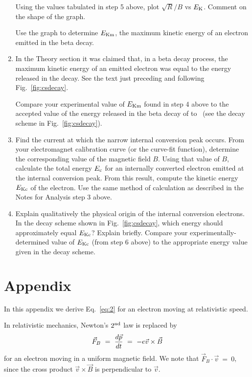 \begin{enumerate}
Using the values tabulated in step 5 above, plot
$\sqrt{R}/B$ vs $E_{\rm K}$.  Comment on the shape of the
graph.

Use the graph to determine $E_{\rm Km}$, the maximum kinetic energy of an
electron emitted in the beta decay.

\item In the Theory section it was claimed that, in a beta decay
process, the maximum kinetic energy of an emitted electron was equal to
the energy released in the decay.  See the text just preceding and
following Fig.~\ref{fig:csdecay}.

Compare your experimental value of $E_{\rm Km}$ found in step 4 above to the
accepted value of the energy released in the beta decay of \cs to \bam~(see the
\cs decay scheme in Fig.~\ref{fig:csdecay}).

\item Find the current at which the narrow internal conversion peak occurs.
  From your electromagnet calibration curve (or the curve-fit function),
  determine the corresponding value of the magnetic field $B$.  Using that value
  of $B$, calculate the total energy $E_{\rm c}$ for an internally converted
  electron emitted at the internal conversion peak.  From this result, compute
  the kinetic energy $E_{\rm Kc}$ of the electron.  Use the same method of
  calculation as described in the Notes for Analysis step 3 above.

\item Explain qualitatively the physical origin of the internal
conversion electrons.  In the decay scheme shown in Fig.~\ref{fig:csdecay}, which
energy should approximately equal $E_{\rm Kc}$?
Explain briefly.  Compare your experimentally-determined value of
$E_{\rm Kc}$ (from step 6 above) to the
appropriate energy value given in the decay scheme.
\end{enumerate}

\section{Appendix}
In this appendix we derive Eq.~\ref{eq:2} for an electron moving at relativistic
speed.

In relativistic mechanics, Newton's
$2^{\rm nd}$ law is replaced by
\begin{equation}
\vec{F}_B ~=~ {d\vec{p} \over dt} ~=~ -e \vec{v} \times \vec{B}
\end{equation}
for an electron
moving  in a uniform magnetic field. We note that $\vec{F}_B \cdot \vec{v} ~=~ 0$,
since the cross product $\vec{v} \times \vec{B}$
is perpendicular to $\vec{v}$.

